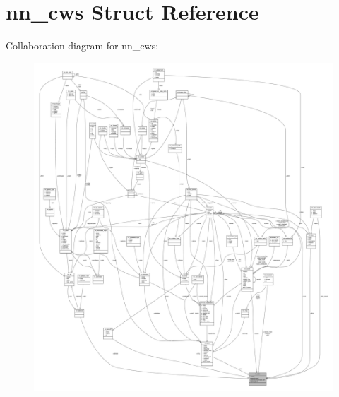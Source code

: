 \hypertarget{structnn__cws}{}\section{nn\+\_\+cws Struct Reference}
\label{structnn__cws}


Collaboration diagram for nn\+\_\+cws\+:\nopagebreak
\begin{figure}[H]
\begin{center}
\leavevmode
\includegraphics[width=350pt]{structnn__cws__coll__graph}
\end{center}
\end{figure}
